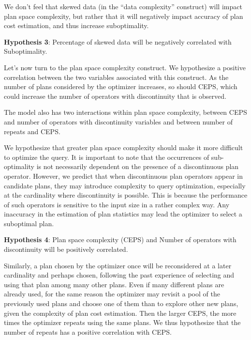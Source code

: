 \documentclass[prodmode,acmtods]{acmsmall}
\begin{document}
\vspace{0.6em}
We don't feel that skewed data (in the ``data complexity''
construct) will impact plan space
complexity, but rather that it will negatively impact accuracy of plan cost
estimation, and thus increase suboptimality.

\vspace{0.6em}\noindent
{\bf Hypothesis 3}: Percentage of skewed data will be negatively correlated with Suboptimality.

\vspace{0.6em}
Let's now turn to the plan space complexity construct. We hypothesize a positive
correlation between the two variables associated with this construct. As the
number of plans considered by the optimizer increases, so should CEPS, which
could increase the number of operators with discontinuity that is observed.

The model also has two interactions within plan space
complexity, between 
CEPS and number of operators with discontinuity variables and between number of repeats and CEPS.

We hypothesize that greater plan space complexity should make it more
difficult to optimize the query.  It is important to note that the
occurrences of sub-optimality is not necessarily dependent on the presence
of a discontinuous plan operator. However, we predict that when
discontinuous plan operators appear in candidate plans, they may introduce
complexity to query optimization, especially at the cardinality where
discontinuity is possible. This is because the performance of such operators
is sensitive to the input size in a rather complex way. Any inaccuracy in
the estimation of plan statistics may lead the optimizer to select a suboptimal
plan.

\vspace{0.6em}\noindent
{\bf Hypothesis 4}: Plan space complexity (CEPS) and Number of operators
with discontinuity will be positively correlated.

\vspace{0.6em}
Similarly, a plan chosen by the optimizer once will be reconsidered at a
later cardinality and perhaps chosen, following
the past experience of selecting and using that plan among many other plans.
Even if many different plans are already used, 
for the same reason the optimizer may revisit a pool of 
the previously used plans and choose one of them than to explore other new plans, 
given the complexity of plan cost estimation. 
Then the larger CEPS, the more times the optimizer repeats using the same plans. 
We thus hypothesize that the number of repeats has a positive correlation with CEPS. 
\end{document}
